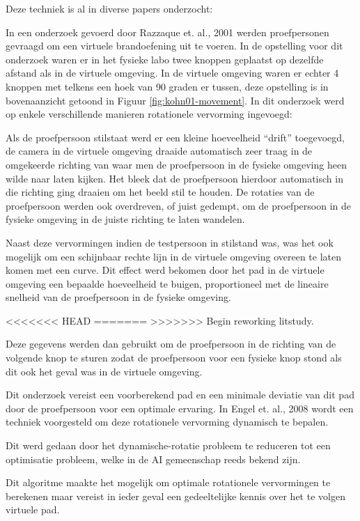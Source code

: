 Deze techniek is al in diverse papers onderzocht:

In een onderzoek gevoerd door Razzaque et. al., 2001 \cite{kohn01} werden 
proefpersonen gevraagd om een virtuele brandoefening uit te voeren. In de 
opstelling voor dit onderzoek waren er in het fysieke labo twee knoppen geplaatst
op dezelfde afstand als in de virtuele omgeving. In de virtuele omgeving waren er
echter 4 knoppen met telkens een hoek van 90 graden er tussen, deze opstelling is
in bovenaanzicht getoond in Figuur \ref{fig:kohn01-movement}. In dit onderzoek
werd op enkele verschillende manieren rotationele vervorming ingevoegd:

Als de proefpersoon stilstaat werd er een kleine hoeveelheid ``drift'' 
toegevoegd, de camera in de virtuele omgeving draaide automatisch zeer traag in 
de omgekeerde richting van waar men de proefpersoon in de fysieke omgeving heen 
wilde naar laten kijken. Het bleek dat de proefpersoon hierdoor automatisch in
die richting ging draaien om het beeld stil te houden. De rotaties van de
proefpersoon werden ook overdreven, of juist gedempt, om de proefpersoon in de
fysieke omgeving in de juiste richting te laten wandelen.

Naast deze vervormingen indien de testpersoon in stilstand was, was het ook
mogelijk om een schijnbaar rechte lijn in de virtuele omgeving overeen te laten
komen met een curve. Dit effect werd bekomen door het pad in de virtuele omgeving
een bepaalde hoeveelheid te buigen, proportioneel met de lineaire snelheid van
de proefpersoon in de fysieke omgeving.

<<<<<<< HEAD
=======
>>>>>>> Begin reworking litstudy.

Deze gegevens werden dan gebruikt om de proefpersoon in de richting van de 
volgende knop te sturen zodat de proefpersoon voor een fysieke knop stond als dit 
ook het geval was in de virtuele omgeving.

Dit onderzoek vereist een voorberekend pad en een minimale deviatie van dit pad 
door de proefpersoon voor een optimale ervaring. In Engel et. al., 2008 
\cite{engel08} wordt een techniek voorgesteld om deze rotationele vervorming 
dynamisch te bepalen.

Dit werd gedaan door het dynamische-rotatie probleem te reduceren tot een 
optimisatie probleem, welke in de AI gemeenschap reeds bekend zijn.

Dit algoritme maakte het mogelijk om optimale rotationele vervormingen te 
berekenen maar vereist in ieder geval een gedeeltelijke kennis over het te volgen
virtuele pad.

